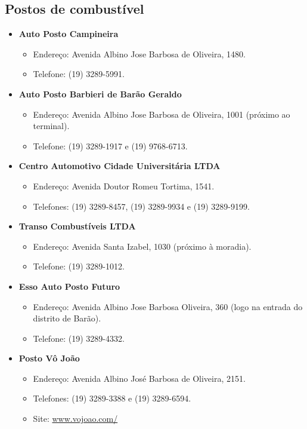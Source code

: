 \subsection{Postos de combustível}

\begin{itemize}
\item  \textbf{Auto Posto Campineira}
\begin{itemize}
\item  Endereço: Avenida Albino Jose Barbosa de Oliveira, 1480.
\item  Telefone: (19) 3289-5991.
\end{itemize}

\item  \textbf{Auto Posto Barbieri de Barão Geraldo}
\begin{itemize}
\item  Endereço: Avenida Albino Jose Barbosa de Oliveira, 1001 (próximo ao terminal).
\item  Telefone: (19) 3289-1917 e (19) 9768-6713.
\end{itemize}

\item  \textbf{Centro Automotivo Cidade Universitária LTDA}
\begin{itemize}
\item  Endereço: Avenida Doutor Romeu Tortima, 1541.
\item  Telefones: (19) 3289-8457, (19) 3289-9934 e (19) 3289-9199.
\end{itemize}

\item  \textbf{Transo Combustíveis LTDA}
\begin{itemize}
\item  Endereço: Avenida Santa Izabel, 1030 (próximo à moradia).
\item  Telefone: (19) 3289-1012.
\end{itemize}

\item  \textbf{Esso Auto Posto Futuro}
\begin{itemize}
\item  Endereço: Avenida Albino Jose Barbosa Oliveira, 360 (logo na entrada do distrito de Barão).
\item  Telefone: (19) 3289-4332.
\end{itemize}

\item  \textbf{Posto Vô João}
\begin{itemize}
\item  Endereço: Avenida Albino José Barbosa de Oliveira, 2151.
\item  Telefones: (19) 3289-3388 e (19) 3289-6594.
\item  Site: \url{www.vojoao.com/}
\end{itemize}
\end{itemize}

